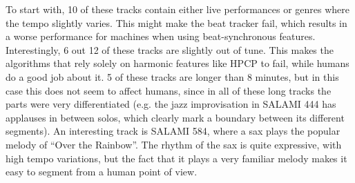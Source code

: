 \documentclass{article}
\begin{document}
To start with, 10 of these tracks contain either live performances or genres where the tempo slightly varies.
This might make the beat tracker fail, which results in a worse performance for machines when using beat-synchronous features.
Interestingly, 6 out 12 of these tracks are slightly out of tune.
This makes the algorithms that rely solely on harmonic features like HPCP to fail, while humans do a good job about it.
5 of these tracks are longer than 8 minutes, but in this case this does not seem to affect humans, since in all of these long tracks the parts were very differentiated (e.g. the jazz improvisation in SALAMI 444 has applauses in between solos, which clearly mark a boundary between its different segments).
An interesting track is SALAMI 584, where a sax plays the popular melody of ``Over the Rainbow''.
The rhythm of the sax is quite expressive, with high tempo variations, but the fact that it plays a very familiar melody makes it easy to segment from a human point of view.









\end{document}
